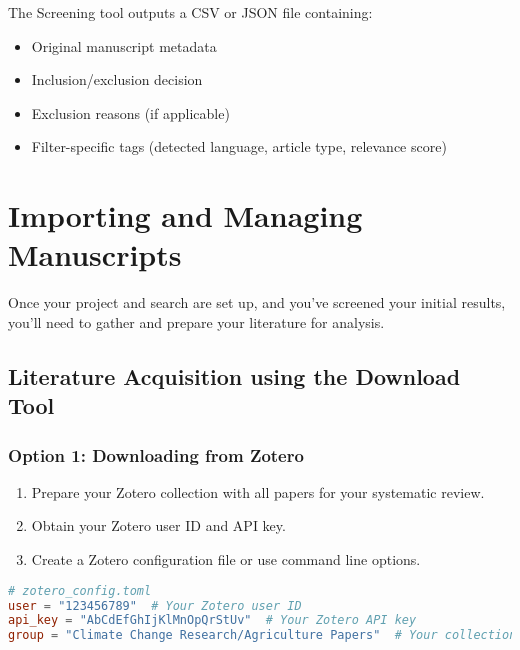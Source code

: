 The Screening tool outputs a CSV or JSON file containing:
\begin{itemize}
    \item Original manuscript metadata
    \item Inclusion/exclusion decision
    \item Exclusion reasons (if applicable)
    \item Filter-specific tags (detected language, article type, relevance score)
\end{itemize}


\section{Importing and Managing Manuscripts}

Once your project and search are set up, and you've screened your initial results, you'll need to gather and prepare your literature for analysis.

\subsection{Literature Acquisition using the Download Tool}

\subsubsection{Option 1: Downloading from Zotero}
\begin{enumerate}
    \item Prepare your Zotero collection with all papers for your systematic review.
    \item Obtain your Zotero user ID and API key.
    \item Create a Zotero configuration file or use command line options.
\end{enumerate}

\begin{configbox}
\begin{lstlisting}[language=TOML]
# zotero_config.toml
user = "123456789"  # Your Zotero user ID
api_key = "AbCdEfGhIjKlMnOpQrStUv"  # Your Zotero API key
group = "Climate Change Research/Agriculture Papers"  # Your collection path
\end{lstlisting}
\end{configbox}

